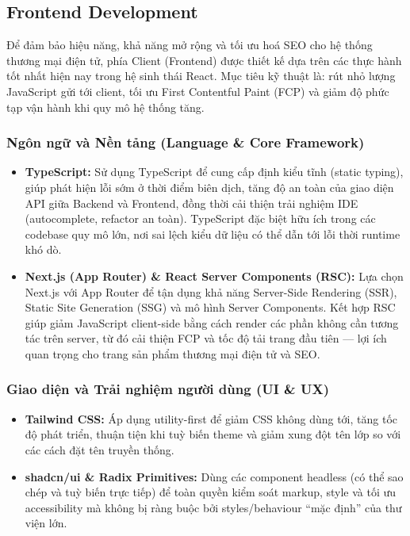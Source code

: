 \subsection{Frontend Development}

Để đảm bảo hiệu năng, khả năng mở rộng và tối ưu hoá SEO cho hệ thống thương mại điện tử, phía Client (Frontend) được thiết kế dựa trên các thực hành tốt nhất hiện nay trong hệ sinh thái React. Mục tiêu kỹ thuật là: rút nhỏ lượng JavaScript gửi tới client, tối ưu First Contentful Paint (FCP) và giảm độ phức tạp vận hành khi quy mô hệ thống tăng.

\subsubsection{Ngôn ngữ và Nền tảng (Language \& Core Framework)}
\begin{itemize}
  \item \textbf{TypeScript:} Sử dụng TypeScript để cung cấp định kiểu tĩnh (static typing), giúp phát hiện lỗi sớm ở thời điểm biên dịch, tăng độ an toàn của giao diện API giữa Backend và Frontend, đồng thời cải thiện trải nghiệm IDE (autocomplete, refactor an toàn). TypeScript đặc biệt hữu ích trong các codebase quy mô lớn, nơi sai lệch kiểu dữ liệu có thể dẫn tới lỗi thời runtime khó dò. 
  \item \textbf{Next.js (App Router) \& React Server Components (RSC):} Lựa chọn Next.js với App Router để tận dụng khả năng Server-Side Rendering (SSR), Static Site Generation (SSG) và mô hình Server Components. Kết hợp RSC giúp giảm JavaScript client-side bằng cách render các phần không cần tương tác trên server, từ đó cải thiện FCP và tốc độ tải trang đầu tiên — lợi ích quan trọng cho trang sản phẩm thương mại điện tử và SEO.
\end{itemize}

\subsubsection{Giao diện và Trải nghiệm người dùng (UI \& UX)}
\begin{itemize}
  \item \textbf{Tailwind CSS:} Áp dụng utility-first để giảm CSS không dùng tới, tăng tốc độ phát triển, thuận tiện khi tuỳ biến theme và giảm xung đột tên lớp so với các cách đặt tên truyền thống.
  \item \textbf{shadcn/ui \& Radix Primitives:} Dùng các component headless (có thể sao chép và tuỳ biến trực tiếp) để toàn quyền kiểm soát markup, style và tối ưu accessibility mà không bị ràng buộc bởi styles/behaviour “mặc định” của thư viện lớn.
\end{itemize}

